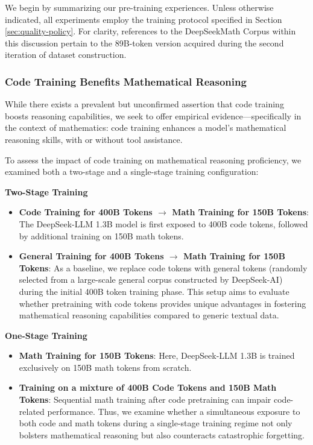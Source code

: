 We begin by summarizing our pre-training experiences. Unless otherwise indicated, all experiments employ the training protocol specified in Section \ref{sec:quality-policy}. For clarity, references to the DeepSeekMath Corpus within this discussion pertain to the 89B-token version acquired during the second iteration of dataset construction.

\subsubsection{Code Training Benefits Mathematical Reasoning}

While there exists a prevalent but unconfirmed assertion that code training boosts reasoning capabilities, we seek to offer empirical evidence—specifically in the context of mathematics: code training enhances a model’s mathematical reasoning skills, with or without tool assistance.

To assess the impact of code training on mathematical reasoning proficiency, we examined both a two-stage and a single-stage training configuration:

\textbf{Two-Stage Training}

\begin{itemize}[topsep=0pt]
    \item \textbf{Code Training for 400B Tokens $\rightarrow$ Math Training for 150B Tokens}: The DeepSeek-LLM 1.3B model is first exposed to 400B code tokens, followed by additional training on 150B math tokens.
    \item \textbf{General Training for 400B Tokens $\rightarrow$ Math Training for 150B Tokens}: As a baseline, we replace code tokens with general tokens (randomly selected from a large-scale general corpus constructed by DeepSeek-AI) during the initial 400B token training phase. This setup aims to evaluate whether pretraining with code tokens provides unique advantages in fostering mathematical reasoning capabilities compared to generic textual data.
\end{itemize}

\textbf{One-Stage Training}

\begin{itemize}[topsep=0pt]
    \item \textbf{Math Training for 150B Tokens}: Here, DeepSeek-LLM 1.3B is trained exclusively on 150B math tokens from scratch.
    \item \textbf{Training on a mixture of 400B Code Tokens and 150B Math Tokens}: Sequential math training after code pretraining can impair code-related performance. Thus, we examine whether a simultaneous exposure to both code and math tokens during a single-stage training regime not only bolsters mathematical reasoning but also counteracts catastrophic forgetting.
\end{itemize}

